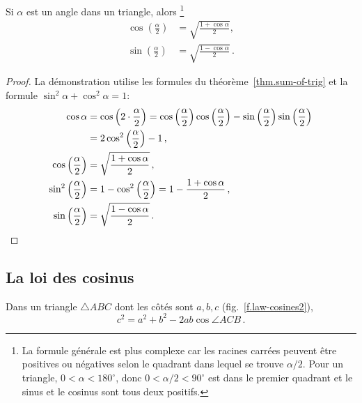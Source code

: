 \begin{theorem}\label{thm.sine-cosine-half}
Si $\alpha$ est un angle dans un triangle, alors \footnote{La formule générale est plus complexe car les racines carrées peuvent être positives ou négatives selon le quadrant dans lequel se trouve $\alpha/2$. 
Pour un triangle, $0\!<\!\alpha\!<\!180^\circ$, donc $0\!<\!\alpha/2\!<\!90^\circ$ est dans le premier quadrant et le sinus et le cosinus sont tous deux positifs.}
\begin{align*}
\cos \left(\frac{\alpha}{2}\right)&=\sqrt{\frac{1+\cos\alpha}{2}},\\
\sin\left(\frac{\alpha}{2}\right)&=\sqrt{\frac{1-\cos\alpha}{2}}\,.
\end{align*}
\end{theorem}

\begin{proof}
La démonstration utilise les formules du théorème~\ref{thm.sum-of-trig} et la formule $\sin^2\alpha+\cos^2\alpha=1$:
\begin{align*}
\cos \alpha&=\cos \left(2\cdot \frac{\alpha}{2}\right)=\cos \left(\frac{\alpha}{2}\right)\cos\left(\frac{\alpha}{2}\right)-\sin \left(\frac{\alpha}{2}\right)\sin\left(\frac{\alpha}{2}\right)\\
&=2\cos^2 \left(\frac{\alpha}{2}\right)-1\,,\\
\cos \left(\frac{\alpha}{2}\right)&=\sqrt{\frac{1+\cos\alpha}{2}}\,,\\
\sin^2\left(\frac{\alpha}{2}\right)&= 1-\cos^2\left(\frac{\alpha}{2}\right)=1-\frac{1+\cos\alpha}{2}\,,\\
\sin \left(\frac{\alpha}{2}\right)&=\sqrt{\frac{1-\cos\alpha}{2}}\,.\qedhere
\end{align*}
\end{proof}


\subsection{La loi des cosinus}

\begin{theorem}
Dans un triangle $\triangle ABC$ dont les côtés sont $a,b,c$ (fig.~\ref{f.law-cosines2}),\label{thm.law-of-cosines}
\[
c^2=a^2+b^2-2ab\cos \angle ACB\,.
\]
\end{theorem}

\medskip


